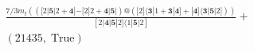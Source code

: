 \documentclass[varwidth, border=5pt]{standalone}
\begin{document}
\begin{my}
$\begin{gathered}
\scriptscriptstyle\frac{7/3m_t(([2|𝟓|2+𝟒|-[2|2+𝟒|𝟓|)@(|2]⟨𝟑|1+𝟑|𝟒]+|𝟒]⟨𝟑|𝟓|2]))}{[2|𝟒|𝟓|2]⟨1|𝟓|2]} +\\
\scriptscriptstyle(21435,\;\text{True}) \phantom{+}
\end{gathered}$
\end{my}
\end{document}
